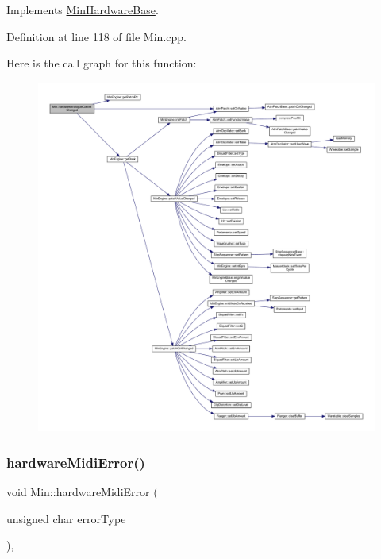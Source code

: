 Implements \hyperlink{class_min_hardware_base_a68f71adaa4f8ed5d170fa09820f63871}{Min\+Hardware\+Base}.



Definition at line 118 of file Min.\+cpp.

Here is the call graph for this function\+:
\nopagebreak
\begin{figure}[H]
\begin{center}
\leavevmode
\includegraphics[width=350pt]{dd/d34/class_min_aead3e428133f75538420c1e67c532fa7_cgraph}
\end{center}
\end{figure}
\mbox{\label{class_min_a854b62697ad910d3bb0536fe7fd3d725}} 
\subsubsection{\texorpdfstring{hardware\+Midi\+Error()}{hardwareMidiError()}}
{\footnotesize\ttfamily void Min\+::hardware\+Midi\+Error (\begin{DoxyParamCaption}\item[{unsigned char}]{error\+Type }\end{DoxyParamCaption})\hspace{0.3cm}{\ttfamily [inline]}, {\ttfamily [virtual]}}



